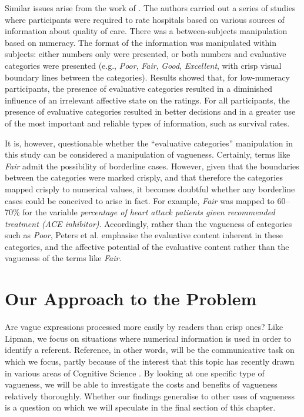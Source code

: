 \documentclass[ %
  graybox       %
 ,envcountchap  %
 ,sectrefs      %
]{svmono}
\begin{document}
Similar issues arise from the work of \citet{peters2009bringing}. The authors carried out a series of studies where participants were required to rate hospitals based on various sources of information about quality of care. There was a between-subjects manipulation based on numeracy. The format of the information was manipulated within subjects: either numbers only were presented, or both numbers and evaluative categories were presented (e.g., \emph{Poor}, \emph{Fair}, \emph{Good}, \emph{Excellent}, with crisp visual boundary lines between the categories). Results showed that, for low-numeracy participants, the presence of evaluative categories resulted in a diminished influence of an irrelevant affective state on the ratings. For all participants, the presence of evaluative categories resulted in better decisions and in a greater use of the most important and reliable types of information, such as survival rates.

It is, however, questionable whether the ``evaluative categories'' manipulation in this study can be considered a manipulation of vagueness. Certainly, terms like \emph{Fair} admit the possibility of borderline cases. However, given that the boundaries between the categories were marked crisply, and that therefore the categories mapped crisply to numerical values, it becomes doubtful whether any borderline cases could be conceived to arise in fact. For example, \emph{Fair} was mapped to 60--70\% for the variable \emph{percentage of heart attack patients given recommended treatment (ACE inhibitor)}. Accordingly, rather than the vagueness of categories such as \emph{Poor}, Peters et al. emphasise the evaluative content inherent in these categories, and the affective potential of the evaluative content rather than the vagueness of the terms like {\em Fair}.

\section{Our Approach to the Problem}
Are vague expressions processed more easily by readers than crisp ones? Like Lipman, we focus on situations where numerical information is used in order to identify a referent. Reference, in other words, will be the communicative task on which we focus, partly because of the interest that this topic has recently drawn in various areas of Cognitive Science \citep{vanDeemterCMR}. By looking at one specific type of vagueness, we will be able to investigate the costs and benefits of vagueness relatively thoroughly. Whether our findings generalise to other uses of vagueness is a question on which we will speculate in the final section of this chapter.
\end{document}
